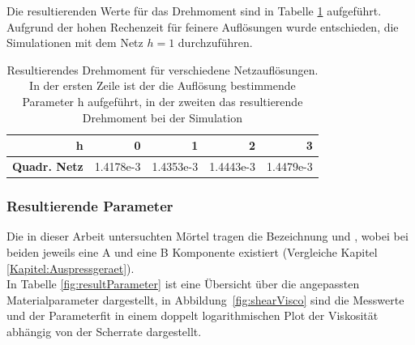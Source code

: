 Die resultierenden Werte für das Drehmoment sind in Tabelle \ref{fig:ResultingTorque} aufgeführt. Aufgrund der hohen Rechenzeit für feinere Auflösungen wurde entschieden, die Simulationen mit dem Netz $h=1$ durchzuführen.
%
\begin{table}
    \centering
    \begin{tabular}{r r r r r}
        \textbf{h} \vline & 0 & 1 & 2 & 3\\
        \hline
        \textbf{Quadr. Netz} \vline & 1.4178e-3 & 1.4353e-3 & 1.4443e-3 & 1.4479e-3\\
    \end{tabular}
    \caption{Resultierendes Drehmoment für verschiedene Netzauflösungen.
    In der ersten Zeile ist der die Auflösung bestimmende Parameter h aufgeführt, in der zweiten das resultierende Drehmoment bei der Simulation}
    \label{fig:ResultingTorque}
\end{table}
%
\subsubsection{Resultierende Parameter}
Die in dieser Arbeit untersuchten Mörtel tragen die Bezeichnung \hit{} und \re{}, wobei bei beiden jeweils eine A und eine B Komponente existiert (Vergleiche Kapitel \ref{Kapitel:Auspressgeraet}).\\
In Tabelle \ref{fig:resultParameter} ist eine Übersicht über die angepassten Materialparameter dargestellt, in Abbildung~\ref{fig:shearVisco} sind die Messwerte und der Parameterfit in einem doppelt logarithmischen Plot der Viskosität abhängig von der Scherrate dargestellt.

